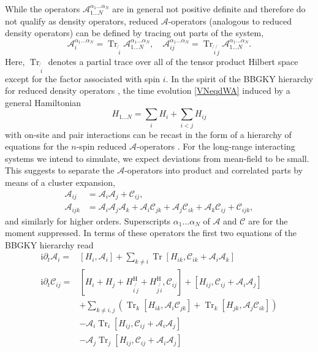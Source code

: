 \documentclass[aps,prl,showpacs,amsmath,amssymb,superscriptaddress,reprint,10pt]{revtex4-1}
\newcommand\ii{{\mathrm{i}}}
\newcommand{\Com}[2]{\left[{#1},{#2}\right]}
\DeclareMathOperator{\Tr}{{Tr}}
\begin{document}
While the operators $\mathscr{A}_{1\dotsc N}^{\alpha_1\dotsc\alpha_N}$ are in general not positive definite and therefore do not qualify as density operators, reduced $\mathscr{A}$-operators (analogous to reduced density operators) can be defined by tracing out parts of the system,
\begin{equation}
\mathscr{A}_i^{\alpha_1\dotsc\alpha_N}=\Tr_{\not{\,i}} \mathscr{A}_{1\dotsc N}^{\alpha_1\dotsc\alpha_N},\quad \mathscr{A}_{ij}^{\alpha_1\dotsc\alpha_N}=\Tr_{\not{\,i}\not{\,j}} \mathscr{A}_{1\dotsc N}^{\alpha_1\dotsc\alpha_N}.
\end{equation}
Here, $\Tr_{\not{\,i}}$ denotes a partial trace over all of the tensor product Hilbert space except for the factor associated with spin $i$. In the spirit of the BBGKY hierarchy for reduced density operators \cite{Bonitz}, the time evolution \eqref{VNeqdWA} induced by a general Hamiltonian
\begin{equation}\label{e:Hgen}
H_{1\dotsc N} = \sum_i H_i + \sum_{i<j}H_{ij}
\end{equation}
with on-site and pair interactions can be recast in the form of a hierarchy of equations for the $n$-spin reduced $\mathscr{A}$-operators \cite{Note1}. For the long-range interacting systems we intend to simulate, we expect deviations from mean-field to be small. This suggests to separate the $\mathscr{A}$-operators into product and correlated parts by means of a cluster expansion,
\begin{subequations}
\begin{align}
\mathscr{A}_{ij}&=\mathscr{A}_i \mathscr{A}_j+\mathscr{C}_{ij},\label{e:cluster1}\\
\mathscr{A}_{ijk}&=\mathscr{A}_i \mathscr{A}_j \mathscr{A}_k + \mathscr{A}_i \mathscr{C}_{jk} + \mathscr{A}_j \mathscr{C}_{ik} + \mathscr{A}_k \mathscr{C}_{ij} + \mathscr{C}_{ijk},\label{e:cluster2}
\end{align}
\end{subequations}
and similarly for higher orders. Superscripts $\alpha_1\dotsc\alpha_N$ of $\mathscr{A}$ and $\mathscr{C}$ are for the moment suppressed. In terms of these operators the first two equations of the BBGKY hierarchy read
\begin{subequations}
\begin{align}
\ii\partial_t \mathscr{A}_i=&\Com{H_i}{\mathscr{A}_i}+\sum_{k\neq i}\Tr\Com{H_{ik}}{\mathscr{C}_{ik}+\mathscr{A}_i \mathscr{A}_k}\label{e:1st_order}\\
\ii\partial_t \mathscr{C}_{ij}=&\Com{H_i+H_j+H_{i\not{\,j}}^\text{H}+H_{j\not{\,i}}^\text{H}}{\mathscr{C}_{ij}}+\Com{H_{ij}}{\mathscr{C}_{ij}+\mathscr{A}_i \mathscr{A}_j}\nonumber\\
&+\sum_{k\neq i,j}\left(\Tr_k\Com{H_{ik}}{\mathscr{A}_i \mathscr{C}_{jk}}+\Tr_k\Com{H_{jk}}{\mathscr{A}_j \mathscr{C}_{ik}}\right)\nonumber\\
&-\mathscr{A}_i\Tr_i\Com{H_{ij}}{\mathscr{C}_{ij}+\mathscr{A}_i \mathscr{A}_j}\nonumber\\
&-\mathscr{A}_j\Tr_j\Com{H_{ij}}{\mathscr{C}_{ij}+\mathscr{A}_i \mathscr{A}_j}\label{e:2nd_order}
\end{align}
\end{subequations}
\end{document}
